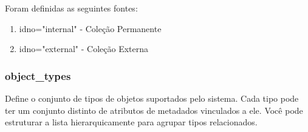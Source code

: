Foram definidas as seguintes fontes:
\begin{enumerate}
	\item idno="internal" - Coleção Permanente
	\item idno="external" - Coleção Externa
\end{enumerate}



\subsubsection{object\_types}
Define o conjunto de tipos de objetos suportados pelo sistema. Cada tipo pode ter um conjunto distinto de atributos de metadados vinculados a ele. Você pode estruturar a lista hierarquicamente para agrupar tipos relacionados.

